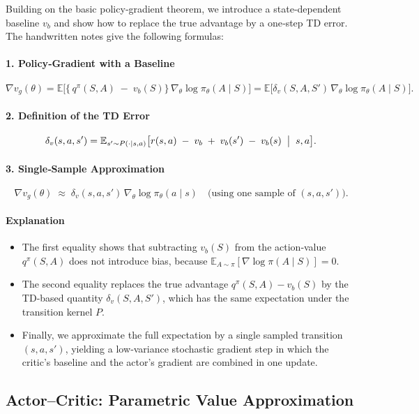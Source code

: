 Building on the basic policy‐gradient theorem, we introduce a state‐dependent baseline \(v_b\) and show how to replace the true advantage by a one‐step TD error.  The handwritten notes give the following formulas:

\paragraph{1. Policy‐Gradient with a Baseline}
\[
\nabla v_g(\theta)
=
\mathbb{E}\bigl[\{\,q^\pi(S,A)\;-\;v_b(S)\}\,\nabla_\theta\log\pi_\theta(A\mid S)\bigr]
=
\mathbb{E}\bigl[\delta_v(S,A,S')\,\nabla_\theta\log\pi_\theta(A\mid S)\bigr].
\]

\paragraph{2. Definition of the TD Error}
\[
\delta_v(s,a,s')
=
\mathbb{E}_{s'\sim P(\cdot\mid s,a)}
\bigl[r(s,a)\;-\;v_b
\;+\;v_b(s')
\;-\;v_b(s)\;\bigm|\;s,a\bigr].
\]

\paragraph{3. Single‐Sample Approximation}
\[
\nabla v_g(\theta)
\;\approx\;
\delta_v(s,a,s')\,\nabla_\theta\log\pi_\theta(a\mid s)
\quad\text{(using one sample of \((s,a,s')\)).}
\]

\paragraph{Explanation}
\begin{itemize}
  \item The first equality shows that subtracting \(v_b(S)\) from the action‐value \(q^\pi(S,A)\) does not introduce bias, because \(\mathbb{E}_{A\sim\pi}[\nabla\log\pi(A\mid S)]=0\).
  \item The second equality replaces the true advantage \(q^\pi(S,A)-v_b(S)\) by the TD‐based quantity \(\delta_v(S,A,S')\), which has the same expectation under the transition kernel \(P\).
  \item Finally, we approximate the full expectation by a single sampled transition \((s,a,s')\), yielding a low‐variance stochastic gradient step in which the critic’s baseline and the actor’s gradient are combined in one update.
\end{itemize}
\subsection{Actor–Critic: Parametric Value Approximation}

